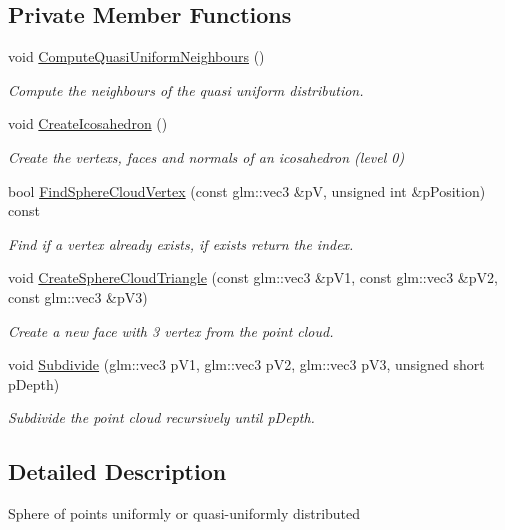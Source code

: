 \subsection*{Private Member Functions}
\begin{DoxyCompactItemize}
\item 
void \hyperlink{class_sphere_point_cloud_a3e0d3c60d70cfe99c2d6de29c73c03da}{Compute\+Quasi\+Uniform\+Neighbours} ()
\begin{DoxyCompactList}\small\item\em Compute the neighbours of the quasi uniform distribution. \end{DoxyCompactList}\item 
void \hyperlink{class_sphere_point_cloud_a2b3f0d6a9ec362b7092d5d57db48a308}{Create\+Icosahedron} ()
\begin{DoxyCompactList}\small\item\em Create the vertexs, faces and normals of an icosahedron (level 0) \end{DoxyCompactList}\item 
bool \hyperlink{class_sphere_point_cloud_aa3b15e437f2985aba5cc4d25f6247f31}{Find\+Sphere\+Cloud\+Vertex} (const glm\+::vec3 \&p\+V, unsigned int \&p\+Position) const 
\begin{DoxyCompactList}\small\item\em Find if a vertex already exists, if exists return the index. \end{DoxyCompactList}\item 
void \hyperlink{class_sphere_point_cloud_acbdfea7e32eb80be3f7f789a341aaee4}{Create\+Sphere\+Cloud\+Triangle} (const glm\+::vec3 \&p\+V1, const glm\+::vec3 \&p\+V2, const glm\+::vec3 \&p\+V3)
\begin{DoxyCompactList}\small\item\em Create a new face with 3 vertex from the point cloud. \end{DoxyCompactList}\item 
void \hyperlink{class_sphere_point_cloud_ac6da28fe26729163facc32139595e758}{Subdivide} (glm\+::vec3 p\+V1, glm\+::vec3 p\+V2, glm\+::vec3 p\+V3, unsigned short p\+Depth)
\begin{DoxyCompactList}\small\item\em Subdivide the point cloud recursively until {\itshape p\+Depth}. \end{DoxyCompactList}\end{DoxyCompactItemize}


\subsection{Detailed Description}
Sphere of points uniformly or quasi-\/uniformly distributed

